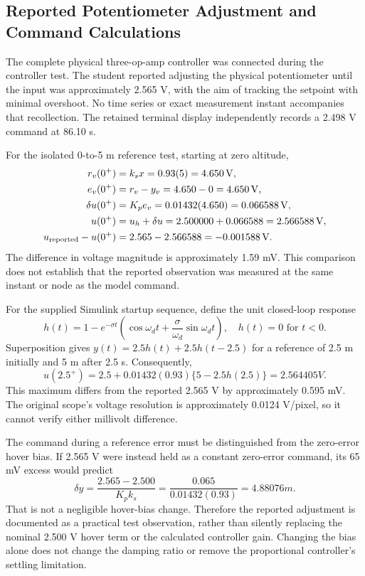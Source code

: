 \subsection{Reported Potentiometer Adjustment and Command Calculations}\label{app:adjustment}
The complete physical three-op-amp controller was connected during the controller test. The student reported adjusting the physical potentiometer until the input was approximately 2.565 V, with the aim of tracking the setpoint with minimal overshoot. No time series or exact measurement instant accompanies that recollection. The retained terminal display independently records a 2.498 V command at 86.10 s.

For the isolated 0-to-5 m reference test, starting at zero altitude,
\begin{align}
r_v(0^+)&=k_sx=0.93(5)=4.650\,\mathrm{V},\\
e_v(0^+)&=r_v-y_v=4.650-0=4.650\,\mathrm{V},\\
\delta u(0^+)&=K_pe_v=0.01432(4.650)=0.066588\,\mathrm{V},\\
u(0^+)&=u_h+\delta u=2.500000+0.066588=2.566588\,\mathrm{V},\\
u_{\rm reported}-u(0^+)&=2.565-2.566588=-0.001588\,\mathrm{V}.
\end{align}
The difference in voltage magnitude is approximately 1.59 mV. This comparison does not establish that the reported observation was measured at the same instant or node as the model command.

For the supplied Simulink startup sequence, define the unit closed-loop response
\begin{equation}
h(t)=1-e^{-\sigma t}\left(\cos\omega_dt+\frac{\sigma}{\omega_d}\sin\omega_dt\right),\quad h(t)=0\text{ for }t<0.
\end{equation}
Superposition gives $y(t)=2.5h(t)+2.5h(t-2.5)$ for a reference of 2.5 m initially and 5 m after 2.5 s. Consequently,
\begin{equation}
u(2.5^+)=2.5+0.01432(0.93)\{5-2.5h(2.5)\}=2.564405\unit{V}.
\end{equation}
This maximum differs from the reported 2.565 V by approximately 0.595 mV. The original scope's voltage resolution is approximately 0.0124 V/pixel, so it cannot verify either millivolt difference.

The command during a reference error must be distinguished from the zero-error hover bias. If 2.565 V were instead held as a constant zero-error command, its 65 mV excess would predict
\begin{equation}
\delta y=\frac{2.565-2.500}{K_pk_s}=\frac{0.065}{0.01432(0.93)}=4.88076\unit{m}.
\end{equation}
That is not a negligible hover-bias change. Therefore the reported adjustment is documented as a practical test observation, rather than silently replacing the nominal 2.500 V hover term or the calculated controller gain. Changing the bias alone does not change the damping ratio or remove the proportional controller's settling limitation.
